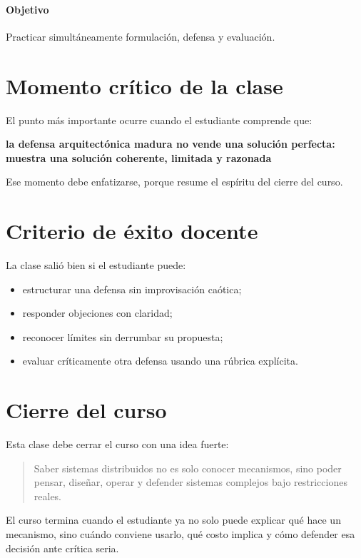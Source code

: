 \documentclass[variant=docente,cover=institutional,mode=screen]{ua-engineering-v6-article}
\begin{document}
\paragraph{Objetivo}
Practicar simultáneamente formulación, defensa y evaluación.

\section{Momento crítico de la clase}

El punto más importante ocurre cuando el estudiante comprende que:

\begin{center}
\textbf{la defensa arquitectónica madura no vende una solución perfecta: muestra una solución coherente, limitada y razonada}
\end{center}

Ese momento debe enfatizarse, porque resume el espíritu del cierre del curso.

\section{Criterio de éxito docente}

La clase salió bien si el estudiante puede:

\begin{itemize}
\item estructurar una defensa sin improvisación caótica;
\item responder objeciones con claridad;
\item reconocer límites sin derrumbar su propuesta;
\item evaluar críticamente otra defensa usando una rúbrica explícita.
\end{itemize}

\section{Cierre del curso}

Esta clase debe cerrar el curso con una idea fuerte:

\begin{quote}
Saber sistemas distribuidos no es solo conocer mecanismos, sino poder pensar, diseñar, operar y defender sistemas complejos bajo restricciones reales.
\end{quote}

\begin{uakeybox}
El curso termina cuando el estudiante ya no solo puede explicar qué hace un mecanismo, sino cuándo conviene usarlo, qué costo implica y cómo defender esa decisión ante crítica seria.
\end{uakeybox}
\end{document}
